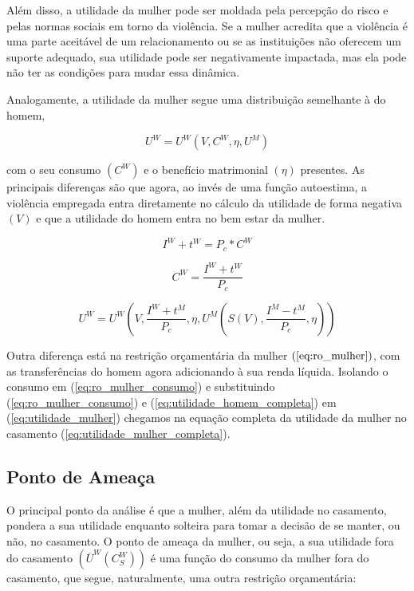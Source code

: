 Além disso, a utilidade da mulher pode ser moldada pela percepção do risco e pelas normas sociais em torno da violência. Se a mulher acredita que a violência é uma parte aceitável de um relacionamento ou se as instituições não oferecem um suporte adequado, sua utilidade pode ser negativamente impactada, mas ela pode não ter as condições para mudar essa dinâmica.

Analogamente, a utilidade da mulher segue uma distribuição semelhante à do homem, 

\begin{equation}
    U^W = U^W(V, C^W, \eta, U^M)
\label{eq:utilidade_mulher}
\end{equation}

com o seu consumo $(C^W)$ e o benefício matrimonial $(\eta)$ presentes. As principais diferenças são que agora, ao invés de uma função autoestima, a violência empregada entra diretamente no cálculo da utilidade de forma negativa $(V)$ e que a utilidade do homem entra no bem estar da mulher. 

\begin{equation}
    I^W + t^W = P_c * C^W
   \label{eq:ro_mulher} 
\end{equation}

\begin{equation}
    C^W = \frac{I^W + t^W}{P_c}
    \label{eq:ro_mulher_consumo}
\end{equation}

\begin{equation}
    U^W = U^W(V, \frac{I^W + t^M}{P_c}, \eta, U^M(S(V),\frac{I^M - t^M}{P_c},\eta))
    \label{eq:utilidade_mulher_completa}
\end{equation}

Outra diferença está na restrição orçamentária da mulher $(\ref{eq:ro_mulher})$, com as transferências do homem agora adicionando à sua renda líquida. Isolando o consumo em (\ref{eq:ro_mulher_consumo}) e substituindo (\ref{eq:ro_mulher_consumo}) e (\ref{eq:utilidade_homem_completa})
em (\ref{eq:utilidade_mulher}) chegamos na equação completa da utilidade da mulher no casamento (\ref{eq:utilidade_mulher_completa}).

\subsection{Ponto de Ameaça}

O principal ponto da análise é que a mulher, além da utilidade no casamento, pondera a sua utilidade enquanto solteira para tomar a decisão de se manter, ou não, no casamento. O ponto de ameaça da mulher, ou seja, a sua utilidade fora do casamento $(\overline{U}^W(C_S^W))$ é uma função do consumo da mulher fora do casamento, que segue, naturalmente, uma outra restrição orçamentária:

